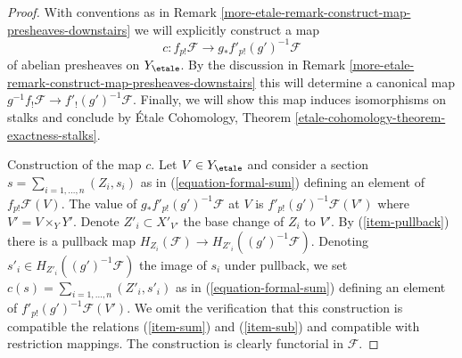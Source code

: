 \begin{proof}
With conventions as in Remark \ref{more-etale-remark-construct-map-presheaves-downstairs}
we will explicitly construct a map
$$
c : f_{p!}\mathcal{F} \longrightarrow g_*f'_{p!}(g')^{-1}\mathcal{F}
$$
of abelian presheaves on $Y_\etale$. By the discussion in
Remark \ref{more-etale-remark-construct-map-presheaves-downstairs}
this will determine a canonical map
$g^{-1}f_!\mathcal{F} \to f'_!(g')^{-1}\mathcal{F}$. Finally, we
will show this map induces isomorphisms on stalks and conclude by
\'Etale Cohomology, Theorem \ref{etale-cohomology-theorem-exactness-stalks}.

\medskip\noindent
Construction of the map $c$. Let $V \in Y_\etale$ and consider a section
$s = \sum_{i = 1, \ldots, n} (Z_i, s_i)$ as in
(\ref{equation-formal-sum}) defining an element of $f_{p!}\mathcal{F}(V)$.
The value of $g_*f'_{p!}(g')^{-1}\mathcal{F}$ at $V$ is
$f'_{p!}(g')^{-1}\mathcal{F}(V')$ where $V' = V \times_Y Y'$.
Denote $Z'_i \subset X'_{V'}$ the base change of $Z_i$ to $V'$.
By (\ref{item-pullback}) there is a pullback map
$H_{Z_i}(\mathcal{F}) \to H_{Z'_i}((g')^{-1}\mathcal{F})$.
Denoting $s'_i \in H_{Z'_i}((g')^{-1}\mathcal{F})$ the image of $s_i$
under pullback, we set $c(s) = \sum_{i = 1, \ldots, n} (Z'_i, s'_i)$ as in
(\ref{equation-formal-sum}) defining an element of
$f'_{p!}(g')^{-1}\mathcal{F}(V')$. We omit the verification
that this construction is compatible the relations
(\ref{item-sum}) and (\ref{item-sub}) and compatible
with restriction mappings. The construction is clearly
functorial in $\mathcal{F}$.


\end{proof}
